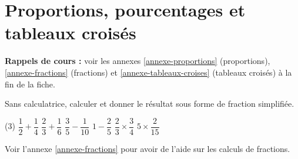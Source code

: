 \documentclass[10pt,a4paper]{article}
\begin{document}

\section{Proportions, pourcentages et tableaux croisés}

\textbf{Rappels de cours :} voir les annexes \ref{annexe-proportions} (proportions), \ref{annexe-fractions} (fractions) et \ref{annexe-tableaux-croises} (tableaux croisés) à la fin de la fiche.
\nopagebreak

\begin{bloc}
\begin{exo}
Sans calculatrice, calculer et donner le résultat sous forme de fraction simplifiée.
\begin{tasks}(3)
    \task \(\dfrac{1}{2}+\dfrac{1}{4}\)
    \task \(\dfrac{2}{3}+\dfrac{1}{6}\)
    \task \(\dfrac{3}{5}-\dfrac{1}{10}\)
    \task \(1-\dfrac{2}{5}\)
    \task \(\dfrac{2}{3}\times\dfrac{3}{4}\)
    \task \(5\times\dfrac{2}{15}\)
\end{tasks}
\end{exo}

\begin{indication}
    Voir l'annexe \ref{annexe-fractions} pour avoir de l'aide sur les calculs de fractions.
\end{indication}
\end{bloc}
\end{document}
